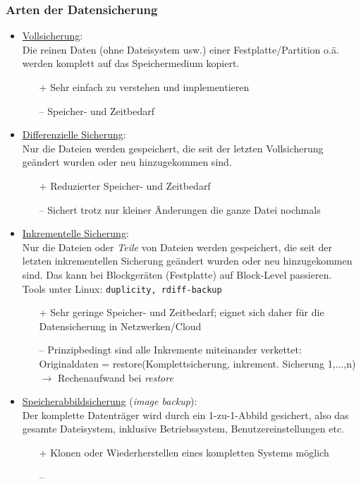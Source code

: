 \subsubsection{Arten der Datensicherung}
\begin{itemize}
	\item \underline{Vollsicherung}:\\ 
	Die reinen Daten (ohne Dateisystem usw.) einer Festplatte/Partition o.ä. werden komplett auf das Speichermedium kopiert.
	\begin{itemize}
		\item[+] Sehr einfach zu verstehen und implementieren
		\item[--] Speicher- und Zeitbedarf
	\end{itemize}
	\item \underline{Differenzielle Sicherung}:\\ Nur die Dateien werden gespeichert, die seit der letzten Vollsicherung geändert wurden oder neu hinzugekommen sind.
	\begin{itemize}
		\item[+] Reduzierter Speicher- und Zeitbedarf
		\item[--] Sichert trotz nur kleiner Änderungen die ganze Datei nochmals
	\end{itemize}
	\item \underline{Inkrementelle Sicherung}:\\ Nur die Dateien oder \textit{Teile} von Dateien werden gespeichert, die seit der letzten inkrementellen Sicherung geändert wurden oder neu hinzugekommen sind. Das kann bei Blockgeräten (Festplatte) auf Block-Level passieren.\\
	Tools unter Linux: \texttt{duplicity, rdiff-backup}
	\begin{itemize}
		\item[+] Sehr geringe Speicher- und Zeitbedarf; eignet sich daher für die Datensicherung in Netzwerken/Cloud
		\item[--] Prinzipbedingt sind alle Inkremente miteinander verkettet:\\
		Originaldaten = restore(Komplettsicherung, inkrement. Sicherung 1,...,n)\\ 
		$\to$ Rechenaufwand bei \textit{restore}
	\end{itemize}
	\item \underline{Speicherabbildsicherung} (\textit{image backup}):\\ 
Der komplette Datenträger wird durch ein 1-zu-1-Abbild gesichert, also das gesamte Dateisystem, inklusive Betriebssystem, Benutzereinstellungen etc.
\begin{itemize}
	\item[+] Klonen oder Wiederherstellen eines kompletten Systems möglich
	\item[--] 
\end{itemize}
\end{itemize}

